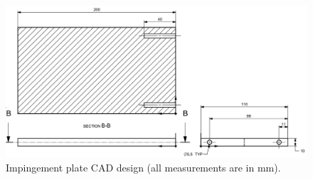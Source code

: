 \begin{figure}[!tbh] 
	\centering
	\includegraphics[width=1\textwidth]{plate_draw.png} 
	\caption{Impingement plate CAD design (all measurements are in mm).}
	\label{fig:plate_draw}
\end{figure}


